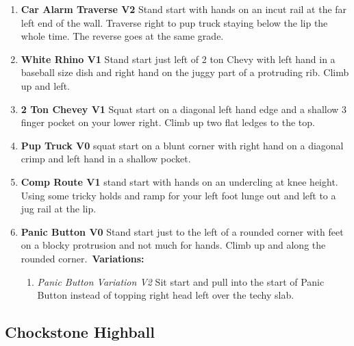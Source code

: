 \begin{enumerate}[resume]
	\item\label{rt:Car Alarm Traverse} \colorbox{green!20}{\textbf{Car Alarm Traverse V2   } }
	\newline Stand start with hands on an incut rail at the far left end of the wall. Traverse right to pup truck staying below the lip the whole time. The reverse goes at the same grade.\
	\item\label{rt:White Rhino} \colorbox{green!20}{\textbf{White Rhino V1   } }
	\newline Stand start just left of 2 ton Chevy with left hand in a baseball size dish and right hand on the juggy part of a protruding rib. Climb up and left.\
	\item\label{rt:2 Ton Chevey} \colorbox{green!20}{\textbf{2 Ton Chevey V1    } }
	\newline Squat start on a diagonal left hand edge and a shallow 3 finger pocket on your lower right. Climb up two flat ledges to the top.\
	\item\label{rt:Pup Truck} \colorbox{green!20}{\textbf{Pup Truck V0    } }
	\newline squat start on a blunt corner with right hand on a diagonal crimp and left hand in a shallow pocket.\
	\item\label{rt:Comp Route} \colorbox{green!20}{\textbf{Comp Route V1    } }
	\newline stand start with hands on an undercling at knee height. Using some tricky holds and ramp for your left foot lunge out and left to a jug rail at the lip.\
	\item\label{rt:Panic Button} \colorbox{green!20}{\textbf{Panic Button V0   } }
	\newline Stand start just to the left of a rounded corner with feet on a blocky protrusion and not much for hands. Climb up and along the rounded corner.\
	\newline \textbf{Variations:}
	\begin{enumerate}
		\item\label{vr:Panic Button Variation} \colorbox{green!20}{\emph{Panic Button Variation V2   }  }
		\newline Sit start and pull into the start of Panic Button instead of topping right head left over the techy slab.\
	\end{enumerate}
\end{enumerate}
\subsection*{Chockstone Highball}\label{bf:Chockstone Highball}
\


